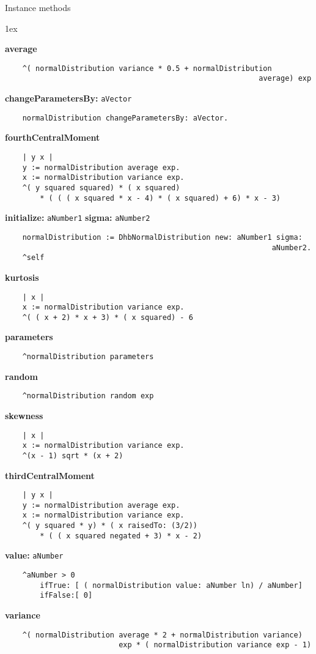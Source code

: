 Instance methods
{\parskip 1ex\par\noindent}
{\bf average}
\begin{verbatim}
    ^( normalDistribution variance * 0.5 + normalDistribution 
                                                          average) exp

\end{verbatim}
{\bf changeParametersBy:} {\tt aVector}
\begin{verbatim}
    normalDistribution changeParametersBy: aVector.

\end{verbatim}
{\bf fourthCentralMoment}
\begin{verbatim}
    | y x |
    y := normalDistribution average exp.
    x := normalDistribution variance exp.
    ^( y squared squared) * ( x squared)
        * ( ( ( x squared * x - 4) * ( x squared) + 6) * x - 3)

\end{verbatim}
{\bf initialize:} {\tt aNumber1} {\bf sigma:} {\tt aNumber2}
\begin{verbatim}
    normalDistribution := DhbNormalDistribution new: aNumber1 sigma: 
                                                             aNumber2.
    ^self

\end{verbatim}
{\bf kurtosis}
\begin{verbatim}
    | x |
    x := normalDistribution variance exp.
    ^( ( x + 2) * x + 3) * ( x squared) - 6

\end{verbatim}
{\bf parameters}
\begin{verbatim}
    ^normalDistribution parameters

\end{verbatim}
{\bf random}
\begin{verbatim}
    ^normalDistribution random exp

\end{verbatim}
{\bf skewness}
\begin{verbatim}
    | x |
    x := normalDistribution variance exp.
    ^(x - 1) sqrt * (x + 2)

\end{verbatim}
{\bf thirdCentralMoment}
\begin{verbatim}
    | y x |
    y := normalDistribution average exp.
    x := normalDistribution variance exp.
    ^( y squared * y) * ( x raisedTo: (3/2))
        * ( ( x squared negated + 3) * x - 2)

\end{verbatim}
{\bf value:} {\tt aNumber}
\begin{verbatim}
    ^aNumber > 0
        ifTrue: [ ( normalDistribution value: aNumber ln) / aNumber]
        ifFalse:[ 0]

\end{verbatim}
{\bf variance}
\begin{verbatim}
    ^( normalDistribution average * 2 + normalDistribution variance) 
                          exp * ( normalDistribution variance exp - 1)

\end{verbatim}

